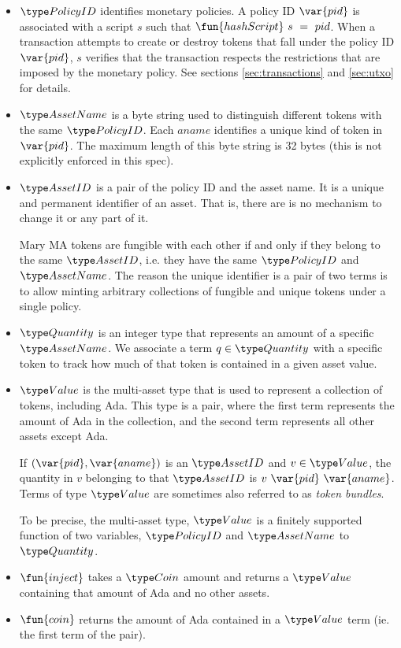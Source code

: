 \begin{itemize}
  \item $\PolicyID$ identifies monetary policies. A policy ID $\var{pid}$ is associated with a script
    $s$ such that $\fun{hashScript}~s~=~pid$. When a transaction attempts to create or destroy tokens
    that fall under the policy ID $\var{pid}$,
    $s$ verifies that the transaction
    respects the restrictions that are imposed by the monetary policy.
    See sections \ref{sec:transactions} and \ref{sec:utxo} for details.

  \item $\AssetName$ is a byte string used to distinguish different tokens with the same $\PolicyID$.
    Each $aname$ identifies a unique kind of token in $\var{pid}$. The maximum length of this
    byte string is 32 bytes (this is not explicitly enforced in this spec).

  \item $\AssetID$ is a pair of the policy ID and the asset name. It is a unique and permanent
  identifier of an asset. That is, there are is no mechanism to change it or
  any part of it.

  Mary MA tokens are fungible with each other if and only if they belong to the same $\AssetID$,
  i.e. they have the same $\PolicyID$ and $\AssetName$.
  The reason the unique identifier is a pair of two terms is to allow
  minting arbitrary collections of fungible and unique tokens under a single policy.

  \item $\Quantity$ is an integer type that represents an amount of a specific $\AssetName$. We associate
    a term $q\in\Quantity$ with a specific token to track how much of that token is contained in a given asset value.

  \item $\Value$ is the multi-asset type that is used to represent
    a collection of tokens, including Ada. This type is a pair, where the first
    term represents the amount of Ada in the collection, and the second term
    represents all other assets except Ada.

    If $(\var{pid}, \var{aname})$ is an $\AssetID$ and $v \in \Value$,
    the quantity in $v$ belonging to that $\AssetID$ is $v~\var{pid}~\var{aname}$.
    Terms of type $\Value$ are sometimes also referred to as
    \emph{token bundles}.

   To be precise, the multi-asset
   type, $\Value$ is a finitely supported function of two variables,
   $\PolicyID$ and $\AssetName$ to $\Quantity$.

  \item $\fun{inject}$ takes a $\Coin$ amount and returns a $\Value$ containing
  that amount of Ada and no other assets.

  \item $\fun{coin}$ returns the amount of Ada contained in a $\Value$ term (ie.
  the first term of the pair).
\end{itemize}

